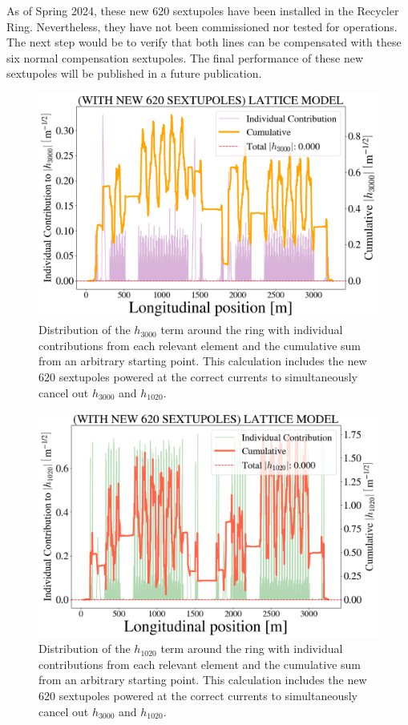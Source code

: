 As of Spring 2024, these new 620 sextupoles have been installed in the Recycler Ring. Nevertheless, they have not been commissioned nor tested for operations. The next step would be to verify that both lines can be compensated with these six normal compensation sextupoles. The final performance of these new sextupoles will be published in a future publication.

\begin{figure}[H]
    \centering
    \includegraphics[width=\columnwidth]{chapter4/new_sexts_h3000.png}
    \caption{Distribution of the $h_{3000}$ term around the ring with individual contributions from each relevant element and the cumulative sum from an arbitrary starting point. This calculation includes the new 620 sextupoles powered at the correct currents to simultaneously cancel out $h_{3000}$ and $h_{1020}$.}
    \label{fig:h3000newsexts}
\end{figure}

\begin{figure}[H]
    \centering
    \includegraphics[width=\columnwidth]{chapter4/new_sexts_h1020.png}
    \caption{Distribution of the $h_{1020}$ term around the ring with individual contributions from each relevant element and the cumulative sum from an arbitrary starting point. This calculation includes the new 620 sextupoles powered at the correct currents to simultaneously cancel out $h_{3000}$ and $h_{1020}$.}
    \label{fig:h1020newsexts}
\end{figure}
